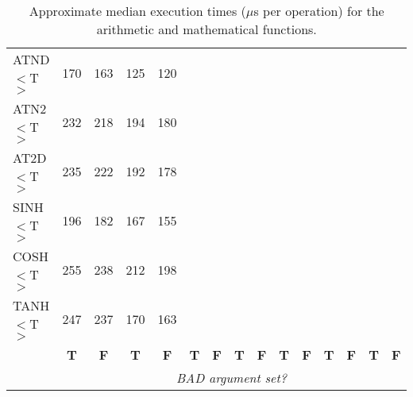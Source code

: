 \begin{table}[h]
\begin{center}
{\begin{tabular}{|l|r|r||r|r||r|r||r|r||r|r||r|r||r|r|}
ATND$<$T$>$ &  170 &  163 &  125 &  120 &      &      &      &      &      &      &      &      &      &      \\
ATN2$<$T$>$ &  232 &  218 &  194 &  180 &      &      &      &      &      &      &      &      &      &      \\
AT2D$<$T$>$ &  235 &  222 &  192 &  178 &      &      &      &      &      &      &      &      &      &      \\
SINH$<$T$>$ &  196 &  182 &  167 &  155 &      &      &      &      &      &      &      &      &      &      \\
COSH$<$T$>$ &  255 &  238 &  212 &  198 &      &      &      &      &      &      &      &      &      &      \\
TANH$<$T$>$ &  247 &  237 &  170 &  163 &      &      &      &      &      &      &      &      &      &      \\
\hline
\multicolumn{1}{c}{} &
\multicolumn{1}{|c}{\bf T} & \multicolumn{1}{|c||}{\bf F} &
\multicolumn{1}{c}{\bf T} & \multicolumn{1}{|c||}{\bf F} &
\multicolumn{1}{c}{\bf T} & \multicolumn{1}{|c||}{\bf F} &
\multicolumn{1}{c}{\bf T} & \multicolumn{1}{|c||}{\bf F} &
\multicolumn{1}{c}{\bf T} & \multicolumn{1}{|c||}{\bf F} &
\multicolumn{1}{c}{\bf T} & \multicolumn{1}{|c||}{\bf F} &
\multicolumn{1}{c}{\bf T} & \multicolumn{1}{|c|}{\bf F}\\
\cline{2-15}
\multicolumn{1}{c}{} &
\multicolumn{14}{|c|}{\em BAD argument set?}\\
\cline{2-15}
\end{tabular}
}
\caption{Approximate median execution times ($\mu$s per operation) for the
 arithmetic and mathematical functions.}
\label{table:valstats}
\end{center}
\end{table}

\newpage

